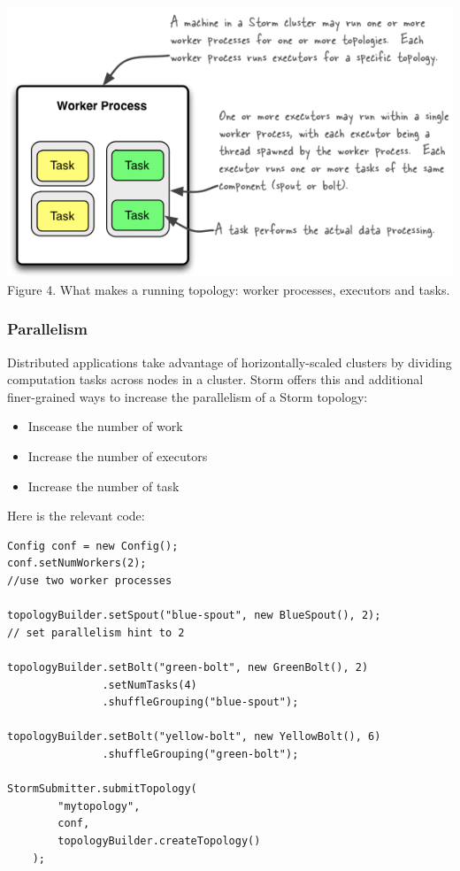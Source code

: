 \documentclass{hcmutarticle}
\begin{document}
\begin{center}
\includegraphics[scale=1.2]{image/relationships-worker-processes-executors-tasks.png}\\[0.5cm]
Figure 4. What makes a running topology: worker processes, executors and tasks.
\end{center}
\subsubsection{Parallelism\\}
Distributed applications take advantage of horizontally-scaled clusters by dividing
computation tasks across nodes in a cluster. Storm offers this and additional finer-grained
ways to increase the parallelism of a Storm topology:\\
\begin{itemize}
\item Inscease the number of work
\item Increase the number of executors
\item Increase the number of task
\end{itemize}
Here is the relevant code:\\
\begin{lstlisting}
Config conf = new Config();
conf.setNumWorkers(2); 
//use two worker processes

topologyBuilder.setSpout("blue-spout", new BlueSpout(), 2); 
// set parallelism hint to 2

topologyBuilder.setBolt("green-bolt", new GreenBolt(), 2)
               .setNumTasks(4)
               .shuffleGrouping("blue-spout");

topologyBuilder.setBolt("yellow-bolt", new YellowBolt(), 6)
               .shuffleGrouping("green-bolt");

StormSubmitter.submitTopology(
        "mytopology",
        conf,
        topologyBuilder.createTopology()
    ); 
\end{lstlisting}
\end{document}
